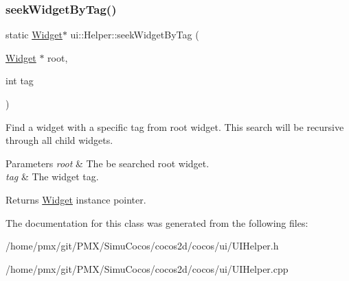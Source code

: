 \subsubsection{\texorpdfstring{seek\+Widget\+By\+Tag()}{seekWidgetByTag()}\hspace{0.1cm}{\footnotesize\ttfamily [2/2]}}
{\footnotesize\ttfamily static \hyperlink{classui_1_1Widget}{Widget}$\ast$ ui\+::\+Helper\+::seek\+Widget\+By\+Tag (\begin{DoxyParamCaption}\item[{\hyperlink{classui_1_1Widget}{Widget} $\ast$}]{root,  }\item[{int}]{tag }\end{DoxyParamCaption})\hspace{0.3cm}{\ttfamily [static]}}

Find a widget with a specific tag from root widget. This search will be recursive through all child widgets. 
\begin{DoxyParams}{Parameters}
{\em root} & The be searched root widget. \\
\hline
{\em tag} & The widget tag. \\
\hline
\end{DoxyParams}
\begin{DoxyReturn}{Returns}
\hyperlink{classui_1_1Widget}{Widget} instance pointer. 
\end{DoxyReturn}


The documentation for this class was generated from the following files\+:\begin{DoxyCompactItemize}
\item 
/home/pmx/git/\+P\+M\+X/\+Simu\+Cocos/cocos2d/cocos/ui/U\+I\+Helper.\+h\item 
/home/pmx/git/\+P\+M\+X/\+Simu\+Cocos/cocos2d/cocos/ui/U\+I\+Helper.\+cpp\end{DoxyCompactItemize}
